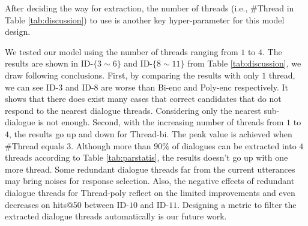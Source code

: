 After deciding the way for extraction, the number of threads (i.e., \#Thread in Table \ref{tab:discussion}) to use is another key hyper-parameter for this model design. 

We tested our model using the number of threads ranging from $1$ to $4$. The results are shown in ID-$\{3\sim6\}$ and ID-$\{8\sim11\}$ from Table \ref{tab:discussion},  we draw following conclusions.
First, by comparing the results with only $1$ thread, we can see ID-$3$ and ID-$8$ are worse than Bi-enc and Poly-enc respectively. It shows that there does exist many cases that correct candidates that do not respond to the nearest dialogue threads. Considering only the nearest sub-dialogue is not enough.
Second, with the increasing number of threads from $1$ to $4$, the results go up and down for Thread-bi. The peak value is achieved when \#Thread equals $3$. Although more than $90\%$ of dialogues can be extracted into $4$ threads according to Table \ref{tab:parstatis}, the results doesn't go up with one more thread.
Some redundant dialogue threads far from the current utterances may bring noises for response selection.
Also, the negative effects of redundant dialogue threads for Thread-poly reflect on the limited improvements and even decreases on hits@50 between ID-$10$ and ID-$11$. 
Designing a metric to filter the extracted dialogue threads automatically is our future work.











